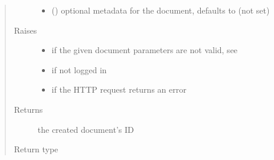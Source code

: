 \documentclass[letterpaper,10pt,english]{sphinxmanual}
\begin{document}
\begin{fulllineitems}
\begin{fulllineitems}
\begin{quote}
\begin{description}
\begin{itemize}
\item {} 
\sphinxAtStartPar
{} (\sphinxstyleliteralemphasis{\sphinxupquote{, }}) \textendash{} optional metadata for the document, defaults to  (not set)

\end{itemize}

\item[{Raises}] \leavevmode\begin{itemize}
\item {} 
\sphinxAtStartPar
{\hyperref[\detokenize{autoapi/pine/client/exceptions/index:pine.client.exceptions.PineClientValueException}]{}} \textendash{} if the given document parameters are not valid, see {\hyperref[\detokenize{autoapi/pine/client/models/index:pine.client.models.is_valid_eve_document}]{}}

\item {} 
\sphinxAtStartPar
{\hyperref[\detokenize{autoapi/pine/client/exceptions/index:pine.client.exceptions.PineClientAuthException}]{}} \textendash{} if not logged in

\item {} 
\sphinxAtStartPar
{\hyperref[\detokenize{autoapi/pine/client/exceptions/index:pine.client.exceptions.PineClientHttpException}]{}} \textendash{} if the HTTP request returns an error

\end{itemize}

\item[{Returns}] \leavevmode
\sphinxAtStartPar
the created document’s ID

\item[{Return type}] \leavevmode
\sphinxAtStartPar
{}

\end{description}\end{quote}

\end{fulllineitems}


\end{fulllineitems}
\end{document}
